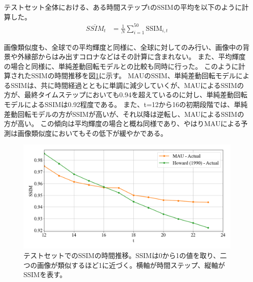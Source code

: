         テストセット全体における、ある時間ステップtのSSIMの平均を以下のように計算した。
        \begin{align}
          \bar{SSIM}_{t} & = \frac{1}{N} \sum_{i=1}^{50} \text{SSIM}_{i,t}
        \end{align}

        画像類似度も、全球での平均輝度と同様に、全球に対してのみ行い、画像中の背景や外縁部からはみ出すコロナなどはその計算に含まれない。
        また、平均輝度の場合と同様に、単純差動回転モデルとの比較も同時に行った。
        このように計算されたSSIMの時間推移を図\ref{fig:exp1_ssim_line}に示す。
        MAUのSSIM、単純差動回転モデルによるSSIMは、共に時間経過とともに単調に減少していくが、MAUによるSSIMの方が、最終タイムステップにおいても0.94を超えているのに対し、単純差動回転モデルによるSSIMは0.92程度である。
        また、t=12から16の初期段階では、単純差動回転モデルの方がSSIMが高いが、それ以降は逆転し、MAUによるSSIMの方が高い。
        この傾向は平均輝度の場合と概ね同様であり、やはりMAUによる予測は画像類似度においてもその低下が緩やかである。 
        
        \begin{figure}[htbp]
          \centering
          \includegraphics[width=\textwidth]{figures/exp1/average_ssim.png}
          \caption{テストセットでのSSIMの時間推移。SSIMは0から1の値を取り、二つの画像が類似するほど1に近づく。横軸が時間ステップ、縦軸がSSIMを表す。}
          \label{fig:exp1_ssim_line}
        \end{figure}
      

